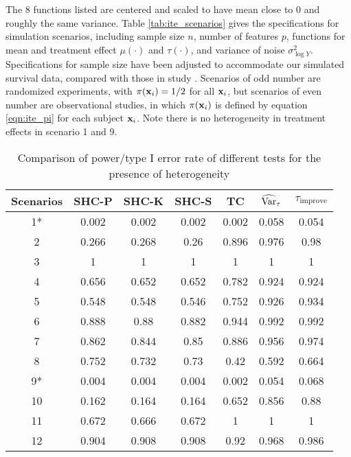     The 8 functions listed are centered and scaled to have mean close to 0 and roughly the same variance. Table \ref{tab:ite_scenarios} gives the specifications for simulation scenarios, including sample size $n$, number of features $p$, functions for mean and treatment effect $\mu(\cdot)$ and $\tau(\cdot)$, and variance of noise $\sigma_{\log Y}^2$. Specifications for sample size have been adjusted to accommodate our simulated survival data, compared with those in study \cite{powers2017some}. Scenarios of odd number are randomized experiments, with $\pi(\mathbf{x}_i) = 1/2$ for all $\mathbf{x}_i$, but scenarios of even number are observational studies, in which $\pi(\mathbf{x}_i)$ is defined by equation \ref{eqn:ite_pi} for each subject $\mathbf{x}_i$. Note there is no heterogeneity in treatment effects in scenario 1 and 9.

    \begin{table}[htbp]
    \caption{Comparison of power/type I error rate of different tests for the presence of heterogeneity}
    \centering
      \begin{threeparttable}
          \begin{tabular}{c|cccccc}
          \toprule
          Scenarios & SHC-P & SHC-K & SHC-S & TC & $\operatorname{\widehat{Var}}_{\tau}$ & $\tau_{\mathrm{improve}}$ \\
          \midrule
          1*    & 0.002 & 0.002 & 0.002 & 0.002 & 0.058 & 0.054 \\
          2     & 0.266 & 0.268 & 0.26  & 0.896 & 0.976 & 0.98 \\
          3     & 1     & 1     & 1     & 1     & 1     & 1 \\
          4     & 0.656 & 0.652 & 0.652 & 0.782 & 0.924 & 0.924 \\
          5     & 0.548 & 0.548 & 0.546 & 0.752 & 0.926 & 0.934 \\
          6     & 0.888 & 0.88  & 0.882 & 0.944 & 0.992 & 0.992 \\
          7     & 0.862 & 0.844 & 0.85  & 0.886 & 0.956 & 0.974 \\
          8     & 0.752 & 0.732 & 0.73  & 0.42  & 0.592 & 0.664 \\
          9*    & 0.004 & 0.004 & 0.004 & 0.002 & 0.054 & 0.068 \\
          10    & 0.162 & 0.164 & 0.164 & 0.652 & 0.856 & 0.88 \\
          11    & 0.672 & 0.666 & 0.672 & 1     & 1     & 1 \\
          12    & 0.904 & 0.908 & 0.908 & 0.92  & 0.968 & 0.986 \\

\end{tabular}
\end{threeparttable}
\end{table}
